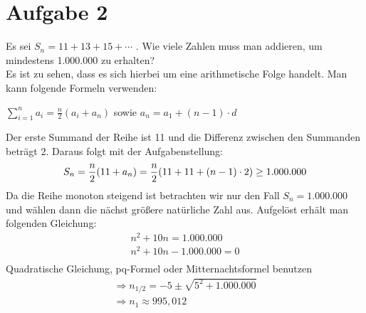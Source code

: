 \documentclass[18pt,a4paper]{article}
\begin{document}
\section*{Aufgabe 2}
Es sei $S_n = 11 + 13 + 15 + \cdots$ . Wie viele Zahlen muss man addieren, um mindestens 1.000.000 zu erhalten?\\[10pt]
Es ist zu sehen, dass es sich hierbei um eine arithmetische Folge handelt. Man kann folgende Formeln verwenden:
\begin{center}
$\displaystyle \sum_{i=1}^{n} a_i = \frac{n}{2}(a_i +a_n)$ sowie $a_n = a_1 + (n-1) \cdot d$\\[5pt]
\end{center}
Der erste Summand der Reihe ist 11 und die Differenz zwischen den Summanden betr\"agt 2. Daraus folgt mit der Aufgabenstellung:
\begin{equation*}
S_n = \frac{n}{2}(11 +a_n) = \frac{n}{2}(11+11+(n-1)\cdot 2) \geq 1.000.000\\[5pt]
\end{equation*}
Da die Reihe monoton steigend ist betrachten wir nur den Fall $S_n = 1.000.000$ und w\"ahlen dann die n\"achst gr\"o{\ss}ere nat\"urliche Zahl aus. Aufgel\"ost erh\"alt man folgenden Gleichung:
\begin{equation*}
\begin{aligned}
n^2 + 10n = 1.000.000\\
n^2 + 10n - 1.000.000= 0\\
\end{aligned}
\end{equation*}
Quadratische Gleichung, pq-Formel oder Mitternachtsformel benutzen
\begin{equation*}
\begin{aligned}
\Rightarrow n_{1/2} = -5 \pm \sqrt{5^2 + 1.000.000}\\
\Rightarrow n_{1} \approx 995,012
\end{aligned}
\end{equation*}
\end{document}
